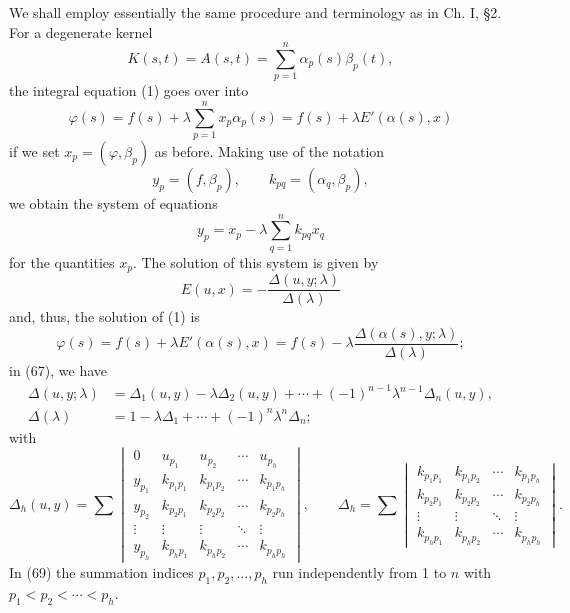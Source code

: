 We shall employ essentially the same procedure and terminology as in Ch. I, \S2. For a degenerate kernel
\[
K(s,t)=A(s,t)=\sum_{p=1}^{n}\alpha_p(s)\beta_p(t),
\]
the integral equation (1) goes over into
\begin{equation}\tag{65}
\varphi(s)=f(s)+\lambda\sum_{p=1}^{n}x_p\alpha_p(s)
=f(s)+\lambda E'(\alpha(s),x)
\end{equation}
if we set $x_p=(\varphi,\beta_p)$ as before. Making use of the notation
\[
y_p=(f,\beta_p),\qquad k_{pq}=(\alpha_q,\beta_p),
\]
we obtain the system of equations
\begin{equation}\tag{66}
y_p=x_p-\lambda\sum_{q=1}^{n}k_{pq}x_q
\end{equation}
for the quantities $x_p$. The solution of this system is given by
\[
E(u,x)=-\frac{\Delta(u,y;\lambda)}{\Delta(\lambda)}
\]
and, thus, the solution of (1) is
\begin{equation}\tag{67}
\varphi(s)=f(s)+\lambda E'(\alpha(s),x)
=f(s)-\lambda\frac{\Delta(\alpha(s),y;\lambda)}{\Delta(\lambda)};
\end{equation}
in (67), we have
\begin{equation}\tag{68}
\begin{aligned}
\Delta(u,y;\lambda)
&=\Delta_1(u,y)-\lambda\Delta_2(u,y)+\cdots
+(-1)^{n-1}\lambda^{n-1}\Delta_n(u,y),\\
\Delta(\lambda)
&=1-\lambda\Delta_1+\cdots+(-1)^n\lambda^n\Delta_n;
\end{aligned}
\end{equation}
with
\begin{equation}\tag{69}
\Delta_h(u,y)=\sum
\begin{vmatrix}
0&u_{p_1}&u_{p_2}&\cdots&u_{p_h}\\
y_{p_1}&k_{p_1p_1}&k_{p_1p_2}&\cdots&k_{p_1p_h}\\
y_{p_2}&k_{p_2p_1}&k_{p_2p_2}&\cdots&k_{p_2p_h}\\
\vdots&\vdots&\vdots&\ddots&\vdots\\
y_{p_h}&k_{p_hp_1}&k_{p_hp_2}&\cdots&k_{p_hp_h}
\end{vmatrix},
\qquad
\Delta_h=\sum
\begin{vmatrix}
k_{p_1p_1}&k_{p_1p_2}&\cdots&k_{p_1p_h}\\
k_{p_2p_1}&k_{p_2p_2}&\cdots&k_{p_2p_h}\\
\vdots&\vdots&\ddots&\vdots\\
k_{p_hp_1}&k_{p_hp_2}&\cdots&k_{p_hp_h}
\end{vmatrix}.
\end{equation}
In (69) the summation indices $p_1,p_2,\ldots,p_h$ run independently from 1 to $n$ with $p_1<p_2<\cdots<p_h$.

